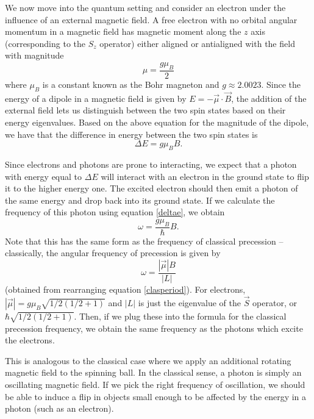 \documentclass{amsart}
\newcommand{\vect}[1]{\overrightarrow{#1}}
\numberwithin{equation}{section}
\begin{document}
We now move into the quantum setting and consider an electron under the influence of an external magnetic field. A free electron with no orbital angular momentum in a magnetic field has magnetic moment along the $z$ axis (corresponding to the $S_z$ operator) either aligned or antialigned with the field with magnitude
\begin{equation}
\label{elecmag}
\mu=\frac{g\mu_B}{2}
\end{equation}
where $\mu_B$ is a constant known as the Bohr magneton and $g\approx2.0023$. Since the energy of a dipole in a magnetic field is given by $E=-\vect{\mu}\cdot\vect{B}$, the addition of the external field lets us distinguish between the two spin states based on their energy eigenvalues. Based on the above equation for the magnitude of the dipole, we have that the difference in energy between the two spin states is
\begin{equation}
\label{deltae}
\Delta E=g\mu_B B\text{.}
\end{equation}

Since electrons and photons are prone to interacting, we expect that a photon with energy equal to $\Delta E$ will interact with an electron in the ground state to flip it to the higher energy one. The excited electron should then emit a photon of the same energy and drop back into its ground state. If we calculate the frequency of this photon using equation \ref{deltae}, we obtain 
\begin{equation}
\omega=\frac{g\mu_B}{\hbar}B\text{.}
\end{equation}
Note that this has the same form as the frequency of classical precession -- classically, the angular frequency of precession is given by $$\omega=\frac{|\vec{\mu}| B}{|L|}$$ (obtained from rearranging equation \ref{clasperiod}). For electrons, $|\vec{\mu}|=g\mu_B\sqrt{1/2(1/2+1)}$ and $|L|$ is just the eigenvalue of the $\vec{S}$ operator, or $\hbar\sqrt{1/2(1/2+1)}$. Then, if we plug these into the formula for the classical precession frequency, we obtain the same frequency as the photons which excite the electrons.

This is analogous to the classical case where we apply an additional rotating magnetic field to the spinning ball. In the classical sense, a photon is simply an oscillating magnetic field. If we pick the right frequency of oscillation, we should be able to induce a flip in objects small enough to be affected by the energy in a photon (such as an electron).
\end{document}
